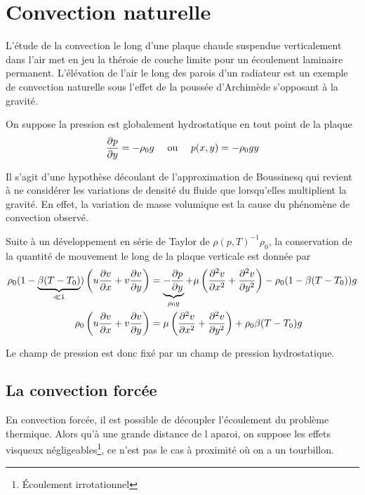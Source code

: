 
\chapter{Convection naturelle}
  L'étude de la convection le long d'une plaque chaude suspendue verticalement dans l'air met en jeu la théroie de couche limite pour un écoulement laminaire permanent. L'élévation de l'air le long des parois d'un radiateur est un exemple de convection naturelle sous l'effet de la poussée d'Archimède s'opposant à la gravité.

  On suppose la pression est globalement hydrostatique en tout point de la plaque
  \begin{equation}
    \pdv{p}{y} (x,y) = -\rho_0 g \quad \textrm{ ou } \quad p(x,y) = -\rho_0 g y
  \end{equation}

  Il s'agit d'une hypothèse découlant de l'approximation de Boussinesq qui revient à ne considérer les variations de densité du fluide que lorsqu'elles multiplient la gravité. En effet, la variation de masse volumique est la cause du phénomène de convection observé.

  Suite à un développement en série de Taylor de $\rho(p,T)^{-1} \rho_0$, la conservation de la quantité de mouvement le long de la plaque verticale est donnée par
  \begin{equation}
    \begin{aligned}
      \rho_0 (1 - \underbrace{\beta (T-T_0)}_{\ll1}) \left(u\pdv{v}{x} + v\pdv{v}{y}\right) &= \underbrace{-\pdv{p}{y}}_{\rho_0 g} + \mu \left(\pdv[2]{v}{x} + \pdv[2]{v}{y}\right) - \rho_0 (1 - \beta(T-T_0))g \\
      \rho_0 \left(u\pdv{v}{x} + v\pdv{v}{y}\right) &= \mu \left(\pdv[2]{v}{x} + \pdv[2]{v}{y}\right) + \rho_0 \beta (T-T_0) g
    \end{aligned}
  \end{equation}

  Le champ de pression est donc fixé par un champ de pression hydrostatique.

  \section{La convection forcée}
    En convection forcée, il est possible de découpler l'écoulement du problème thermique. Alors qu'à une grande distance de l aparoi, on suppose les effets visqueux négligeables\footnote{Écoulement irrotationnel}, ce n'est pas le cas à proximité où on a un tourbillon.

